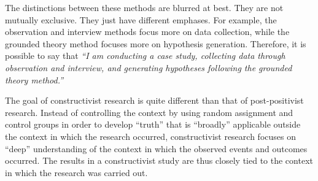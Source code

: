 

The distinctions between these methods are blurred at best. They are not mutually exclusive. They just have different emphases. For example, the observation and interview methods focus more on data collection, while the grounded theory method focuses more on hypothesis generation. Therefore, it is possible to say that \textit{``I am conducting a case study, collecting data through observation and interview, and generating hypotheses following the grounded theory method.''}

The goal of constructivist research is quite different than that of post-positivist research. Instead of controlling the context by using random assignment and control groups in order to develop ``truth'' that is ``broadly'' applicable outside the context in which the research occurred, constructivist research focuses on ``deep'' understanding of the context in which the observed events and outcomes occurred. The results in a constructivist study are thus closely tied to the context in which the research was carried out. 

